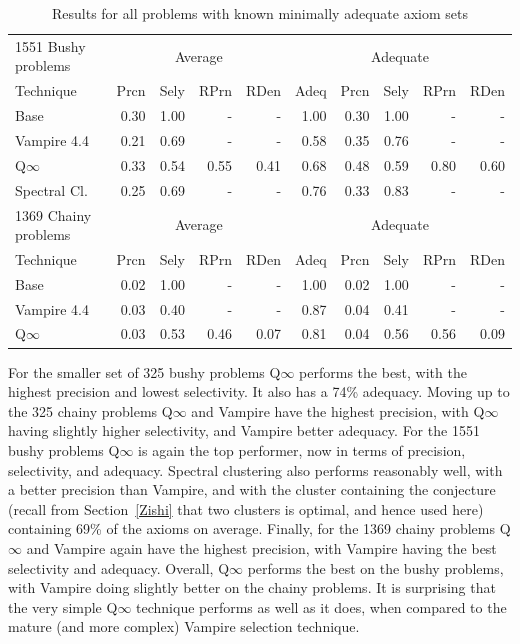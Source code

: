 \documentclass[]{ceurart}
\begin{document}
\begin{table}
\centering
\begin{tabular}{|l|rrrr|r|rrrr|}
\hline
1551 Bushy problems  & \multicolumn{4}{|c|}{Average} & \multicolumn{5}{|c|}{Adequate} \\
Technique       & Prcn & Sely & RPrn & RDen & Adeq & Prcn & Sely & RPrn & RDen \\
\hline
Base            & 0.30 & 1.00 &  -   &  -   & 1.00 & 0.30 & 1.00 &  -   &  -   \\
Vampire 4.4     & 0.21 & 0.69 &  -   &  -   & 0.58 & 0.35 & 0.76 &  -   &  -   \\
Q$\infty$       & 0.33 & 0.54 & 0.55 & 0.41 & 0.68 & 0.48 & 0.59 & 0.80 & 0.60 \\
Spectral Cl.    & 0.25 & 0.69 &  -   &  -   & 0.76 & 0.33 & 0.83 &  -   &  -   \\
\hline
\hline
1369 Chainy problems & \multicolumn{4}{|c|}{Average} & \multicolumn{5}{|c|}{Adequate} \\
Technique       & Prcn & Sely & RPrn & RDen & Adeq & Prcn & Sely & RPrn & RDen \\
\hline
Base            & 0.02 & 1.00 &  -   &  -   & 1.00 & 0.02 & 1.00 &  -   &  -   \\
Vampire 4.4     & 0.03 & 0.40 &  -   &  -   & 0.87 & 0.04 & 0.41 &  -   &  -   \\
Q$\infty$       & 0.03 & 0.53 & 0.46 & 0.07 & 0.81 & 0.04 & 0.56 & 0.56 & 0.09 \\
\hline
\end{tabular}
\caption{Results for all problems with known minimally adequate axiom sets}
\label{Results2078}
\end{table}

For the smaller set of 325 bushy problems Q$\infty$ performs the best, with
the highest precision and lowest selectivity.
It also has a 74\% adequacy.
Moving up to the 325 chainy problems Q$\infty$ and Vampire have the highest
precision, with Q$\infty$ having slightly higher selectivity, and Vampire
better adequacy.
For the 1551 bushy problems Q$\infty$ is again the top performer, now in
terms of precision, selectivity, and adequacy.
Spectral clustering also performs reasonably well, with a better precision
than Vampire, and with the cluster containing the conjecture (recall from 
Section~\ref{Zishi} that two clusters is optimal, and hence used here) 
containing 69\% of the axioms on average.
Finally, for the 1369 chainy problems Q$\infty$ and Vampire again have the 
highest precision, with Vampire having the best selectivity and adequacy.
Overall, Q$\infty$ performs the best on the bushy problems, with Vampire
doing slightly better on the chainy problems.
It is surprising that the very simple Q$\infty$ technique performs 
as well as it does, when compared to the mature (and more complex) Vampire 
selection technique.
\end{document}

